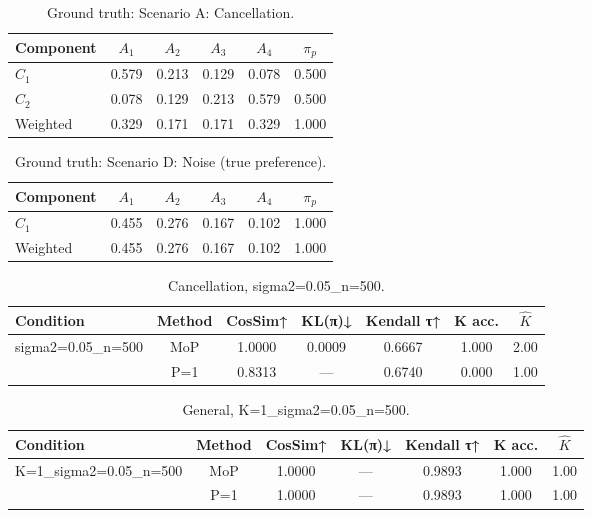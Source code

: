 \begin{table}[ht]
  \centering
  \caption{Ground truth: Scenario A: Cancellation.}
  \label{tab:gt_scenario_a:_cancellation}
  \begin{tabular}{lccccc}
    \toprule
    Component & $A_{1}$ & $A_{2}$ & $A_{3}$ & $A_{4}$ & $\pi_p$ \\
    \midrule
    $C_{1}$ & 0.579 & 0.213 & 0.129 & 0.078 & 0.500 \\
    $C_{2}$ & 0.078 & 0.129 & 0.213 & 0.579 & 0.500 \\
    Weighted & 0.329 & 0.171 & 0.171 & 0.329 & 1.000 \\
    \bottomrule
  \end{tabular}
\end{table}

\begin{table}[ht]
  \centering
  \caption{Ground truth: Scenario D: Noise (true preference).}
  \label{tab:gt_scenario_d:_noise_(true_prefer}
  \begin{tabular}{lccccc}
    \toprule
    Component & $A_{1}$ & $A_{2}$ & $A_{3}$ & $A_{4}$ & $\pi_p$ \\
    \midrule
    $C_{1}$ & 0.455 & 0.276 & 0.167 & 0.102 & 1.000 \\
    Weighted & 0.455 & 0.276 & 0.167 & 0.102 & 1.000 \\
    \bottomrule
  \end{tabular}
\end{table}

\begin{table}[ht]
  \centering
  \caption{Cancellation, sigma2=0.05_n=500.}
  \label{tab:sim_cancellation_sigma20_05_n500}
  \begin{tabular}{lcccccc}
    \toprule
    Condition & Method & CosSim↑ & KL(π)↓ & Kendall τ↑ & K acc. & $\hat{K}$ \\
    \midrule
    sigma2=0.05_n=500 & MoP & 1.0000 & 0.0009 & 0.6667 & 1.000 & 2.00 \\
     & P=1 & 0.8313 & --- & 0.6740 & 0.000 & 1.00 \\
    \bottomrule
  \end{tabular}
\end{table}

\begin{table}[ht]
  \centering
  \caption{General, K=1_sigma2=0.05_n=500.}
  \label{tab:sim_general_K1_sigma20_05_n500}
  \begin{tabular}{lcccccc}
    \toprule
    Condition & Method & CosSim↑ & KL(π)↓ & Kendall τ↑ & K acc. & $\hat{K}$ \\
    \midrule
    K=1_sigma2=0.05_n=500 & MoP & 1.0000 & --- & 0.9893 & 1.000 & 1.00 \\
     & P=1 & 1.0000 & --- & 0.9893 & 1.000 & 1.00 \\
    \bottomrule
  \end{tabular}
\end{table}


